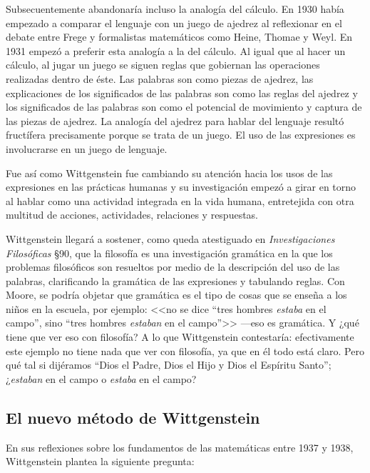 Subsecuentemente abandonaría incluso la analogía del cálculo. En 1930 había
empezado a comparar el lenguaje con un juego de ajedrez al reflexionar en el
debate entre Frege y formalistas matemáticos como Heine, Thomae y
Weyl.\autocite[cf.~][p.134]{bakerhacker2014rules} En 1931 empezó a preferir esta
analogía a la del cálculo. Al igual que al hacer un cálculo, al jugar un juego
se siguen reglas que gobiernan las operaciones realizadas dentro de éste. Las
palabras son como piezas de ajedrez, las explicaciones de los significados de
las palabras son como las reglas del ajedrez y los significados de las palabras
son como el potencial de movimiento y captura de las piezas de ajedrez. La
analogía del ajedrez para hablar del lenguaje resultó fructífera precisamente
porque se trata de un juego. El uso de las expresiones es involucrarse en un
juego de lenguaje.

Fue así como Wittgenstein fue cambiando su atención hacia los usos de las
expresiones en las prácticas humanas y su investigación empezó a girar en torno
al hablar como una actividad integrada en la vida humana, entretejida con otra
multitud de acciones, actividades, relaciones y respuestas.

Wittgenstein llegará a sostener, como queda atestiguado en \emph{Investigaciones
  Filosóficas} \S90, que la filosofía es una investigación gramática en la que
los problemas filosóficos son resueltos por medio de la descripción del uso de
las palabras, clarificando la gramática de las expresiones y tabulando reglas.
Con Moore, se podría objetar que gramática es el tipo de cosas que se enseña a
los niños en la escuela, por ejemplo: <<no se dice ``tres hombres \emph{estaba}
en el campo'', sino ``tres hombres \emph{estaban} en el campo''>> ---eso es
gramática. Y ¿qué tiene que ver eso con filosofía? A lo que Wittgenstein
contestaría: efectivamente este ejemplo no tiene nada que ver con filosofía, ya
que en él todo está claro. Pero qué tal si dijéramos ``Dios el Padre, Dios el
Hijo y Dios el Espíritu Santo''; ¿\emph{estaban} en el campo o \emph{estaba} en
el campo?\autocite[cf.~][55]{bakerhacker2014rules}


\subsection{El nuevo método de Wittgenstein}
En sus reflexiones sobre los fundamentos de las matemáticas entre 1937 y 1938,
Wittgenstein plantea la siguiente pregunta: 


